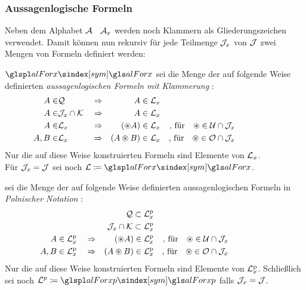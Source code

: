 \subsubsection{Aussagenlogische Formeln}%
\label{subsub:Formeln}

Neben dem Alphabet $\mathcal{A}$ \textbzw\ $\mathcal{A}_x$ werden noch Klammern als Gliederungszeichen verwendet.
Damit können nun rekursiv für jede Teilmenge $\mathcal{J}_x$ von $\mathcal{J}$ zwei Mengen von Formeln definiert werden:

$\glsSym{alForx}$ sei die Menge der auf folgende Weise definierten \emph{aussagenlogischen Formeln mit Klammerung}%
:
\begin{align}
	A    \in & \mathcal{Q}               && \Rightarrow &           A  \in \mathcal{L}_x
	\\
	A    \in & \mathcal{J}_x \cap \mathcal{K}  && \Rightarrow &           A  \in \mathcal{L}_x
	\\
	A    \in & \mathcal{L}_x              && \Rightarrow &   (\circledast A) \in \mathcal{L}_x
	& & \text{, für} \quad \circledast \in \mathcal{U} \cap \mathcal{J}_x
	\\
	A, B \in & \mathcal{L}_x              && \Rightarrow & (A \circledast B) \in \mathcal{L}_x
	& & \text{, für} \quad \circledast \in \mathcal{O} \cap \mathcal{J}_x
	&&&&&&&&&&
\end{align}
Nur die auf diese Weise konstruierten Formeln sind Elemente von $\mathcal{L}_x$.
\\Für $\mathcal{J}_x = \mathcal{J}$ sei noch $\alFor \defeq \glsSym{alForx}$.

 sei die Menge der auf folgende Weise definierten aussagenlogischen Formeln in \emph{Polnischer Notation}%
:
\begin{align}
	&                                  & \mathcal{Q}              \subset \mathcal{L}^\mathrm{p}_x
	\\
	&                                  & \mathcal{J}_x \cap \mathcal{K} \subset \mathcal{L}^\mathrm{p}_x
	\\
	A    \in \mathcal{L}^\mathrm{p}_x & \quad \Rightarrow &  (\circledast A)         \in     \mathcal{L}^\mathrm{p}_x
	& & \text{, für}  \quad \circledast \in \mathcal{U} \cap \mathcal{J}_x
	\\
	A, B \in \mathcal{L}^\mathrm{p}_x & \quad \Rightarrow & (A \circledast B)        \in     \mathcal{L}^\mathrm{p}_x
	& & \text{, für}  \quad \circledast \in \mathcal{O} \cap \mathcal{J}_x
	&&&&&&&&&&
\end{align}
Nur die auf diese Weise konstruierten Formeln sind Elemente von $\mathcal{L}^\mathrm{p}_x$.
Schließlich sei noch $\alForp \defeq \glsSym{alForxp}$ falls $\mathcal{J}_x = \mathcal{J}$.

